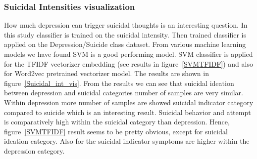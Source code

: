 \documentclass[sn-mathphys,Numbered]{sn-jnl}%
\theoremstyle{thmstyleone}%
\theoremstyle{thmstyletwo}%
\theoremstyle{thmstylethree}%
\begin{document}

\subsubsection{Suicidal Intensities visualization}
How much depression can trigger suicidal thoughts is an interesting question. In this study classifier is trained on the suicidal intensity. Then trained classifier is applied on the Depression/Suicide class dataset. From various machine learning models we have found SVM is a good performing model. SVM classifier is applied for the TFIDF vectorizer embedding (see results in figure~\ref{SVMTFIDF}) and also for Word2vec pretrained vectorizer model. The results are shown in figure~\ref{Suicidal_int_vis}. From the results we can see that suicidal ideation between depression and suicidal categories number of samples are very similar. Within depression more number of samples are showed suicidal indicator category compared to suicide which is an interesting result. Suicidal behavior and attempt is comparatively high within the suicidal category than depression. Hence, figure~\ref{SVMTFIDF} result seems to be pretty obvious, except for suicidal ideation category. Also for the suicidal indicator symptoms are higher within the depression category. 
\end{document}
